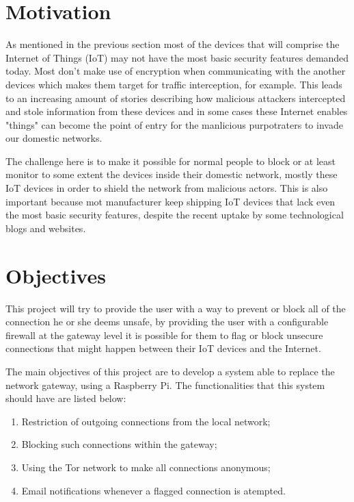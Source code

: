 

\section{Motivation}
\label{sec:mot}
As mentioned in the previous section most of the devices that will comprise the
Internet of Things (IoT) may not have the most basic security features demanded
today. Most don't make use of encryption when communicating with the another
devices which makes them target for traffic interception, for example.
This leads to an increasing amount of stories describing how malicious attackers
intercepted and stole information from these devices and in some cases these
Internet enables "things" can become the point of entry for the manlicious
purpotraters to invade our domestic networks.

The challenge here is to make it possible for normal people to block or at least
monitor to some extent the devices inside their domestic network, mostly these
IoT devices in order to shield the network from malicious actors. This is also
important because mot manufacturer keep shipping IoT devices that lack even the
most basic security features, despite the recent uptake by some technological
blogs and websites.

\section{Objectives}
\label{sec:obj}
This project will try to provide the user with a way to prevent or block all of
the connection he or she deems unsafe, by providing the user with a configurable
firewall at the gateway level it is possible for them to flag or block unsecure
connections that might happen between their IoT devices and the Internet.

The main objectives of this project are to develop a system able to replace the
network gateway, using a Raspberry Pi. The functionalities that this system
should have are listed below:
\begin{enumerate}
	\item Restriction of outgoing connections from the local network;
	\item Blocking such connections within the gateway;
	\item Using the Tor network to make all connections anonymous;
	\item Email notifications whenever a flagged connection is atempted.
\end{enumerate}

